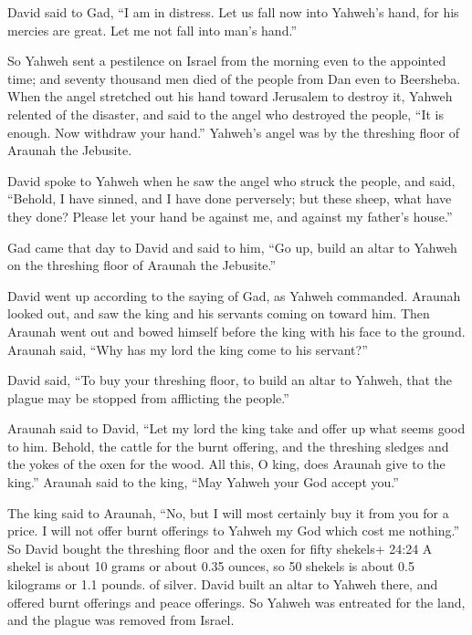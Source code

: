  David said to Gad, ``I am in distress. Let us fall now
into Yahweh's hand, for his mercies are great. Let me not fall into
man's hand.''

 So Yahweh sent a pestilence on Israel from the morning
even to the appointed time; and seventy thousand men died of the people
from Dan even to Beersheba.  When the angel stretched out
his hand toward Jerusalem to destroy it, Yahweh relented of the
disaster, and said to the angel who destroyed the people, ``It is
enough. Now withdraw your hand.'' Yahweh's angel was by the threshing
floor of Araunah the Jebusite.

 David spoke to Yahweh when he saw the angel who struck the
people, and said, ``Behold, I have sinned, and I have done perversely;
but these sheep, what have they done? Please let your hand be against
me, and against my father's house.''

 Gad came that day to David and said to him, ``Go up, build
an altar to Yahweh on the threshing floor of Araunah the Jebusite.''

 David went up according to the saying of Gad, as Yahweh
commanded.  Araunah looked out, and saw the king and his
servants coming on toward him. Then Araunah went out and bowed himself
before the king with his face to the ground.  Araunah said,
``Why has my lord the king come to his servant?''

David said, ``To buy your threshing floor, to build an altar to Yahweh,
that the plague may be stopped from afflicting the people.''

 Araunah said to David, ``Let my lord the king take and
offer up what seems good to him. Behold, the cattle for the burnt
offering, and the threshing sledges and the yokes of the oxen for the
wood.  All this, O king, does Araunah give to the king.''
Araunah said to the king, ``May Yahweh your God accept you.''

 The king said to Araunah, ``No, but I will most certainly
buy it from you for a price. I will not offer burnt offerings to Yahweh
my God which cost me nothing.'' So David bought the threshing floor and
the oxen for fifty shekels+ 24:24 A shekel is about 10 grams or about
0.35 ounces, so 50 shekels is about 0.5 kilograms or 1.1 pounds. of
silver.  David built an altar to Yahweh there, and offered
burnt offerings and peace offerings. So Yahweh was entreated for the
land, and the plague was removed from Israel.
